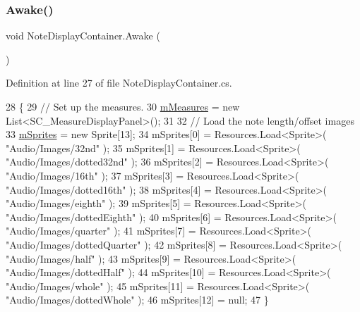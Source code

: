 \subsubsection{\texorpdfstring{Awake()}{Awake()}}
{\footnotesize\ttfamily void Note\+Display\+Container.\+Awake (\begin{DoxyParamCaption}{ }\end{DoxyParamCaption})\hspace{0.3cm}{\ttfamily [private]}}



Definition at line 27 of file Note\+Display\+Container.\+cs.


\begin{DoxyCode}
28     \{
29         \textcolor{comment}{// Set up the measures.}
30         \hyperlink{class_note_display_container_ae5ca6e7ea4ab2baaab9ff649bf25c0d6}{mMeasures} = \textcolor{keyword}{new} List<SC\_MeasureDisplayPanel>();
31 
32         \textcolor{comment}{// Load the note length/offset images}
33         \hyperlink{class_note_display_container_a2816b590b588d86780ae622b3df403ee}{mSprites} = \textcolor{keyword}{new} Sprite[13];
34         mSprites[0] = Resources.Load<Sprite>( \textcolor{stringliteral}{"Audio/Images/32nd"} );
35         mSprites[1] = Resources.Load<Sprite>( \textcolor{stringliteral}{"Audio/Images/dotted32nd"} );
36         mSprites[2] = Resources.Load<Sprite>( \textcolor{stringliteral}{"Audio/Images/16th"} );
37         mSprites[3] = Resources.Load<Sprite>( \textcolor{stringliteral}{"Audio/Images/dotted16th"} );
38         mSprites[4] = Resources.Load<Sprite>( \textcolor{stringliteral}{"Audio/Images/eighth"} );
39         mSprites[5] = Resources.Load<Sprite>( \textcolor{stringliteral}{"Audio/Images/dottedEighth"} );
40         mSprites[6] = Resources.Load<Sprite>( \textcolor{stringliteral}{"Audio/Images/quarter"} );
41         mSprites[7] = Resources.Load<Sprite>( \textcolor{stringliteral}{"Audio/Images/dottedQuarter"} );
42         mSprites[8] = Resources.Load<Sprite>( \textcolor{stringliteral}{"Audio/Images/half"} );
43         mSprites[9] = Resources.Load<Sprite>( \textcolor{stringliteral}{"Audio/Images/dottedHalf"} );
44         mSprites[10] = Resources.Load<Sprite>( \textcolor{stringliteral}{"Audio/Images/whole"} );
45         mSprites[11] = Resources.Load<Sprite>( \textcolor{stringliteral}{"Audio/Images/dottedWhole"} );
46         mSprites[12] = null;
47     \}
\end{DoxyCode}
\mbox{\label{class_note_display_container_abcbda84772a6e66780b0f21928edf853}} 
